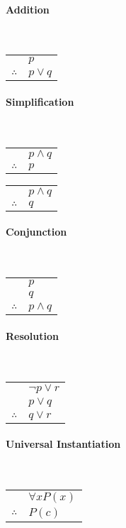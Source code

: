 \documentclass[a4paper, 10pt]{article}
\begin{document}
\begin{multicols}{3}
\paragraph{Addition}\mbox{}\\
\begin{tabular}{c@{\,}l@{}}
                & \(p\) \\\cline{2-2}
\(\therefore\)  & \(p\lor q\)
\end{tabular}

\paragraph{Simplification}\mbox{}\\
\begin{tabular}{c@{\,}l@{}}
                & \(p\land q\) \\\cline{2-2}
\(\therefore\)  & \(p\)
\end{tabular}
\begin{tabular}{c@{\,}l@{}}
                & \(p\land q\) \\\cline{2-2}
\(\therefore\)  & \(q\)
\end{tabular}

\paragraph{Conjunction}\mbox{}\\
\begin{tabular}{c@{\,}l@{}}
                & \(p\) \\
                & \(q\) \\\cline{2-2}
\(\therefore\)  & \(p\land q\)
\end{tabular}

\paragraph{Resolution}\mbox{}\\
\begin{tabular}{c@{\,}l@{}}
                & \(\neg p\lor r\) \\
                & \(p\lor q\) \\\cline{2-2}
\(\therefore\)  & \(q\lor r\)
\end{tabular}

\paragraph{Universal Instantiation}\mbox{}\\
\begin{tabular}{c@{\,}l@{}}
                & \(\forall xP(x)\) \\\cline{2-2}
\(\therefore\)  & \(P(c)\)
\end{tabular}


\end{multicols}
\end{document}
